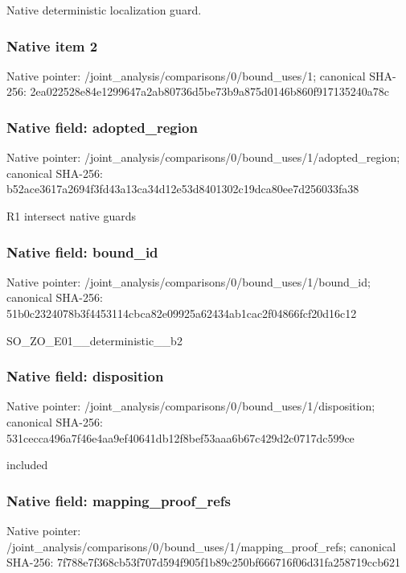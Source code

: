 \documentclass[10pt,a4paper]{article}
\begin{document}
\begingroup\raggedright\sloppy Native deterministic localization guard.\par\endgroup

\subsubsection{Native item 2}
Native pointer: /joint\_\allowbreak{}analysis/comparisons/0/bound\_\allowbreak{}uses/1; canonical SHA-256: 2ea022528e84e1299647a2ab80736d5be73b9a875d0146b860f917135240a78c

\subsubsection{Native field: adopted\_\allowbreak{}region}
Native pointer: /joint\_\allowbreak{}analysis/comparisons/0/bound\_\allowbreak{}uses/1/adopted\_\allowbreak{}region; canonical SHA-256: b52ace3617a2694f3fd43a13ca34d12e53d8401302c19dca80ee7d256033fa38

\begingroup\raggedright\sloppy R1 intersect native guards\par\endgroup

\subsubsection{Native field: bound\_\allowbreak{}id}
Native pointer: /joint\_\allowbreak{}analysis/comparisons/0/bound\_\allowbreak{}uses/1/bound\_\allowbreak{}id; canonical SHA-256: 51b0c2324078b3f4453114cbca82e09925a62434ab1cac2f04866fcf20d16c12

\begingroup\raggedright\sloppy SO\_\allowbreak{}ZO\_\allowbreak{}E01\_\allowbreak{}\_\allowbreak{}deterministic\_\allowbreak{}\_\allowbreak{}b2\par\endgroup

\subsubsection{Native field: disposition}
Native pointer: /joint\_\allowbreak{}analysis/comparisons/0/bound\_\allowbreak{}uses/1/disposition; canonical SHA-256: 531cecca496a7f46e4aa9ef40641db12f8bef53aaa6b67c429d2c0717dc599ce

\begingroup\raggedright\sloppy included\par\endgroup

\subsubsection{Native field: mapping\_\allowbreak{}proof\_\allowbreak{}refs}
Native pointer: /joint\_\allowbreak{}analysis/comparisons/0/bound\_\allowbreak{}uses/1/mapping\_\allowbreak{}proof\_\allowbreak{}refs; canonical SHA-256: 7f788e7f368cb53f707d594f905f1b89c250bf666716f06d31fa258719ccb621
\end{document}
